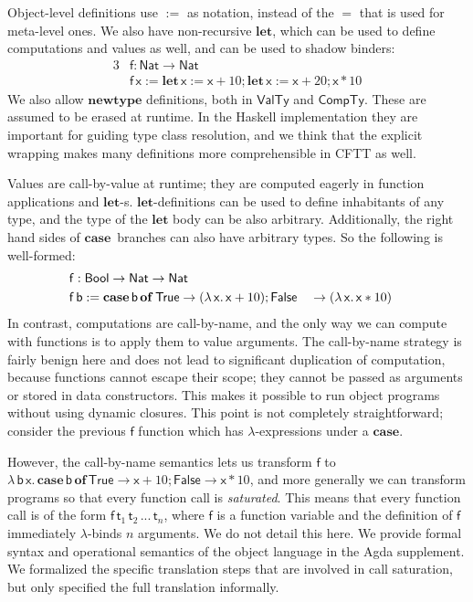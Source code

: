 \documentclass[acmsmall,screen,review,anonymous]{acmart}
\newcommand{\msf}[1]{{\mathsf{#1}}}
\newcommand{\mbf}[1]{{\mathbf{#1}}}
\newcommand{\lam}{\lambda\,}
\newcommand{\of}{\mbf{of}\,}
\newcommand{\letdef}{\mbf{let\,}}
\newcommand{\vb}{\mathsf{b}}
\newcommand{\vx}{\mathsf{x}}
\newcommand{\vf}{\mathsf{f}}
\newcommand{\vt}{\mathsf{t}}
\newcommand{\Bool}{\msf{Bool}}
\newcommand{\case}{\mbf{case\,}}
\newcommand{\VTy}{\msf{ValTy}}
\newcommand{\CTy}{\msf{CompTy}}
\newcommand{\True}{\msf{True}}
\newcommand{\False}{\msf{False}}
\newcommand{\Nat}{\msf{Nat}}
\theoremstyle{remark}
\begin{document}
Object-level definitions use $:=$ as notation, instead of the $=$ that is used
for meta-level ones. We also have non-recursive $\mbf{let}$, which can be used
to define computations and values as well, and can be used to shadow binders:
\begin{alignat*}{3}
  &\vf : \Nat \to \Nat\\
  &\vf\,\vx := \letdef \vx := \vx + 10; \letdef \vx := \vx + 20; \vx * 10
\end{alignat*}
We also allow $\mbf{newtype}$ definitions, both in $\VTy$ and $\CTy$. These are
assumed to be erased at runtime. In the Haskell implementation they are
important for guiding type class resolution, and we think that the explicit
wrapping makes many definitions more comprehensible in CFTT as well.

Values are call-by-value at runtime; they are computed eagerly in function
applications and $\mbf{let}$-s. $\mbf{let}$-definitions can be used to define
inhabitants of any type, and the type of the $\mbf{let}$ body can be also
arbitrary. Additionally, the right hand sides of $\case$ branches can also have
arbitrary types. So the following is well-formed:
\begin{alignat*}{3}
  &\vf : \mathrlap{\Bool \to \Nat \to \Nat}\\
  &\vf\,\vb := \case \vb\,\of \True \to (\lam \vx.\, \vx + 10); \False &&\to (\lam \vx.\, \vx * 10)
\end{alignat*}
In contrast, computations are call-by-name, and the only way we can compute with
functions is to apply them to value arguments. The call-by-name strategy is
fairly benign here and does not lead to significant duplication of computation,
because functions cannot escape their scope; they cannot be passed as arguments
or stored in data constructors. This makes it possible to run object programs
without using dynamic closures. This point is not completely straightforward;
consider the previous $\vf$ function which has $\lambda$-expressions under a
$\mbf{case}$.

However, the call-by-name semantics lets us transform $\vf$ to $\lam
\vb\,\vx.\,\case \vb\,\of \True \to \vx + 10; \False \to \vx * 10$, and more
generally we can transform programs so that every function call is
\emph{saturated}. This means that every function call is of the form
$\vf\,\vt_1\,\vt_2\,...\,\vt_n$, where $\vf$ is a function variable and the
definition of $\vf$ immediately $\lambda$-binds $n$ arguments. We do not detail
this here. We provide formal syntax and operational semantics of the object
language in the Agda supplement. We formalized the specific translation steps
that are involved in call saturation, but only specified the full translation
informally.
\end{document}
